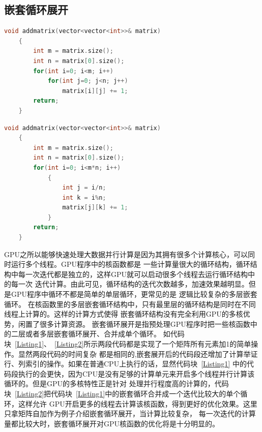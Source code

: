 \subsection{嵌套循环展开}
\begin{lstlisting}[label=Listing1,caption=嵌套循环,language=C++, keywordstyle=\color{blue!70},commentstyle=\color{red!50!green!50!blue!50},frame=shadowbox, rulesepcolor=\color{red!20!green!20!blue!20}] 
void addmatrix(vector<vector<int>>& matrix)
	{
	    int m = matrix.size();
        int n = matrix[0].size();
        for(int i=0; i<m; i++)
            for(int j=0; j<n; j++)
                matrix[i][j] += 1;
        return;
    }		
\end{lstlisting}

\begin{lstlisting}[label=Listing2,caption=嵌套循环展开,language=C++, keywordstyle=\color{blue!70},commentstyle=\color{red!50!green!50!blue!50},frame=shadowbox, rulesepcolor=\color{red!20!green!20!blue!20}] 
void addmatrix(vector<vector<int>>& matrix)
	{
	    int m = matrix.size();
        int n = matrix[0].size();
        for(int i=0; i<m*n; i++)
            {
			    int j = i/n;
			    int k = i%n;
                matrix[j][k] += 1;
			}
        return;
    }		
\end{lstlisting}
GPU之所以能够快速处理大数据并行计算是因为其拥有很多个计算核心，可以同时运行多个线程。GPU程序中的核函数都是
一些计算量很大的循环结构，循环结构中每一次迭代都是独立的，这样GPU就可以启动很多个线程去运行循环结构中的每一次
迭代计算。由此可见，循环结构的迭代次数越多，加速效果越明显。但是GPU程序中循环不都是简单的单层循环，更常见的是
逻辑比较复杂的多层嵌套循环。
在核函数里的多层嵌套循环结构中，只有最里层的循环结构是同时在不同线程上计算的。这样的计算方式使得
嵌套循环结构没有完全利用GPU的多核优势，闲置了很多计算资源。
嵌套循环展开是指预处理GPU程序时把一些核函数中的二层或者多层嵌套循环展开、合并成单个循环。
如代码块~\ref{Listing1}、~\ref{Listing2}所示两段代码都是实现了一个矩阵所有元素加1的简单操作。显然两段代码的时间复杂
都是相同的,嵌套展开后的代码段还增加了计算举证行、列索引的操作。如果在普通CPU上执行的话，显然代码块~\ref{Listing1}
中的代码段执行的会更快，因为CPU是没有足够的计算单元来开启多个线程并行计算该循环的。但是GPU的多核特性正是针对
处理并行程度高的计算的，代码块~\ref{Listing2}把代码块~\ref{Listing1}中的嵌套循环合并成一个迭代比较大的单个循环，这样允许
GPU开启更多的线程去计算该核函数，得到更好的优化效果。这里只拿矩阵自加作为例子介绍嵌套循环展开，当计算比较复杂，
每一次迭代的计算量都比较大时，嵌套循环展开对GPU核函数的优化将是十分明显的。


